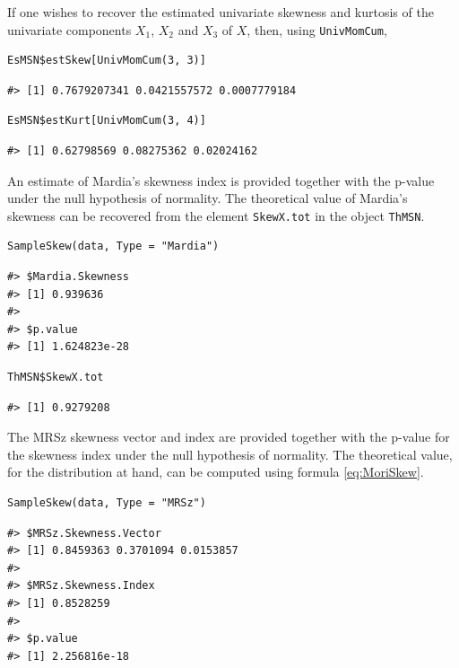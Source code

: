 If one wishes to recover the estimated univariate skewness and kurtosis of the univariate components \(X_1\), \(X_2\) and \(X_3\) of \(X\), then, using \texttt{UnivMomCum},

\begin{verbatim}
EsMSN$estSkew[UnivMomCum(3, 3)]
\end{verbatim}

\begin{verbatim}
#> [1] 0.7679207341 0.0421557572 0.0007779184
\end{verbatim}

\begin{verbatim}
EsMSN$estKurt[UnivMomCum(3, 4)] 
\end{verbatim}

\begin{verbatim}
#> [1] 0.62798569 0.08275362 0.02024162
\end{verbatim}

An estimate of Mardia's skewness index is provided together with the p-value under the null hypothesis of normality. The theoretical value of Mardia's skewness can be recovered from the element \texttt{SkewX.tot} in the object \texttt{ThMSN}.

\begin{verbatim}
SampleSkew(data, Type = "Mardia")
\end{verbatim}

\begin{verbatim}
#> $Mardia.Skewness
#> [1] 0.939636
#> 
#> $p.value
#> [1] 1.624823e-28
\end{verbatim}

\begin{verbatim}
ThMSN$SkewX.tot
\end{verbatim}

\begin{verbatim}
#> [1] 0.9279208
\end{verbatim}

The MRSz skewness vector and index are provided together with the p-value for the skewness index under the null hypothesis of normality. The theoretical value, for the distribution at hand, can be computed using formula \eqref{eq:MoriSkew}.

\begin{verbatim}
SampleSkew(data, Type = "MRSz")
\end{verbatim}

\begin{verbatim}
#> $MRSz.Skewness.Vector
#> [1] 0.8459363 0.3701094 0.0153857
#> 
#> $MRSz.Skewness.Index
#> [1] 0.8528259
#> 
#> $p.value
#> [1] 2.256816e-18
\end{verbatim}


